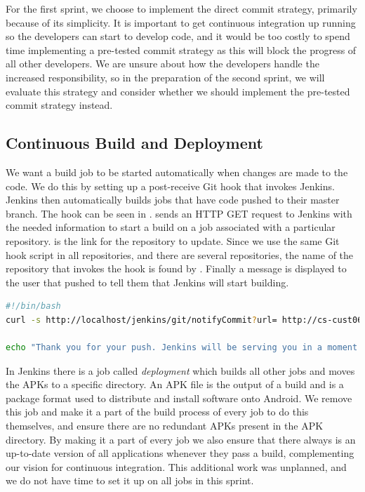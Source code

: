 For the first sprint, we choose to implement the direct commit strategy, primarily because of its simplicity. It is important to get continuous integration up running so the developers can start to develop code, and it would be too costly to spend time implementing a pre-tested commit strategy as this will block the progress of all other developers. We are unsure about how the developers handle the increased responsibility, so in the preparation of the second sprint, we will evaluate this strategy and consider whether we should implement the pre-tested commit strategy instead.

\subsection{Continuous Build and Deployment}\label{sec:auto_deploy}
We want a build job to be started automatically when changes are made to the code. We do this by setting up a post-receive Git hook that invokes Jenkins. Jenkins then automatically builds jobs that have code pushed to their master branch. The hook can be seen in .  sends an HTTP GET request to Jenkins with the needed information to start a build on a job associated with a particular repository.  is the link for the repository to update. Since we use the same Git hook script in all repositories, and there are several repositories, the name of the repository that invokes the hook is found by . Finally a message is displayed to the user that pushed to tell them that Jenkins will start building.

\begin{lstlisting}[float=tbp,language=bash,showstringspaces=false,caption=The post-receive Git hook. It is a Bash script that starts a job on Jenkins upon a push to a Git repository.,label=lst:hook_script_first]
#!/bin/bash
curl -s http://localhost/jenkins/git/notifyCommit?url= http://cs-cust06-int.cs.aau.dk/git-ro/$(basename $(pwd)) > /dev/null

echo "Thank you for your push. Jenkins will be serving you in a moment."
\end{lstlisting}

In Jenkins there is a job called \emph{deployment} which builds all other jobs and moves the APKs to a specific directory. An APK file is the output of a build and is a package format used to distribute and install software onto Android. We remove this job and make it a part of the build process of every job to do this themselves, and ensure there are no redundant APKs present in the APK directory. By making it a part of every job we also ensure that there always is an up-to-date version of all applications whenever they pass a build, complementing our vision for continuous integration. This additional work was unplanned, and we do not have time to set it up on all jobs in this sprint.

